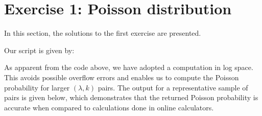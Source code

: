 \section{Exercise 1: Poisson distribution}

In this section, the solutions to the first exercise are presented. 

Our script is given by:


As apparent from the code above, we have adopted a computation in log space. This avoids possible overflow errors and enables us to compute the Poisson probability for larger $(\lambda, k)$ pairs. The output for a representative sample of pairs is given below, which demonstrates that the returned Poisson probability is accurate when compared to calculations done in online calculators. 







